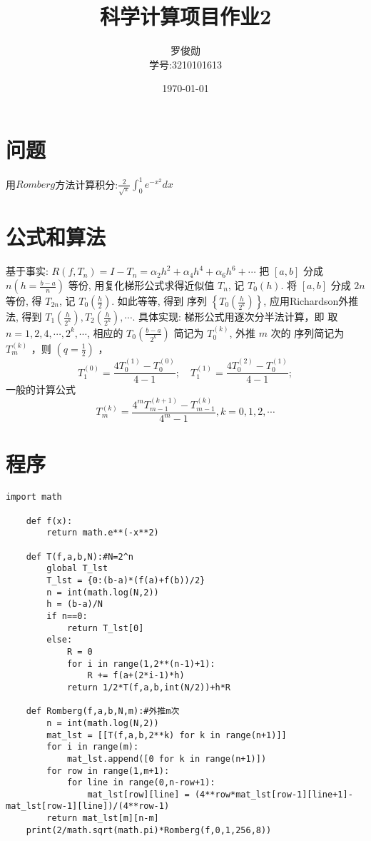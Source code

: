 \documentclass[12pt, a4paper, oneside]{ctexart}
\title{\huge\textbf{科学计算项目作业2}}
\author{罗俊勋\\学号:3210101613}
\date{\today}
\begin{document}
\maketitle
\section*{问题}
用$Romberg$方法计算积分:$\frac{2}{\sqrt{\pi}}\int_0^1e^{-x^2}dx$

\section*{公式和算法}
基于事实: $R\left(f, T_n\right)=I-T_n=\alpha_2 h^2+\alpha_4 h^4+\alpha_6 h^6+\cdots$ 把 $[a, b]$ 分成 $n\left(h=\frac{b-a}{n}\right)$ 等份, 用复化梯形公式求得近似值 $T_n$, 记 $T_0(h)$. 将 $[a, b]$ 分成 $2 n$ 等份, 得 $T_{2 n}$, 记 $T_0\left(\frac{h}{2}\right)$. 如此等等, 得到 序列 $\left\{T_0\left(\frac{h}{2^k}\right)\right\}$, 应用Richardson外推法, 得到 $T_1\left(\frac{h}{2^k}\right), T_2\left(\frac{h}{2^k}\right), \cdots$. 具体实现: 梯形公式用逐次分半法计算，即 取 $n=1,2,4, \cdots, 2^k, \cdots$, 相应的 $T_0\left(\frac{b-a}{2^k}\right)$ 简记为 $T_0^{(k)}$, 外推 $m$ 次的 序列简记为 $T_m^{(k)}$ ，则 $\left(q=\frac{1}{2}\right)$ ，
$$
T_1^{(0)}=\frac{4 T_0^{(1)}-T_0^{(0)}}{4-1} ; \quad T_1^{(1)}=\frac{4 T_0^{(2)}-T_0^{(1)}}{4-1} ;
$$
一般的计算公式
$$
T_m^{(k)}=\frac{4^m T_{m-1}^{(k+1)}-T_{m-1}^{(k)}}{4^m-1}, k=0,1,2, \cdots
$$

\pagebreak
\section*{程序}
\begin{lstlisting}[style = python]
    import math

    def f(x):
        return math.e**(-x**2)

    def T(f,a,b,N):#N=2^n
        global T_lst 
        T_lst = {0:(b-a)*(f(a)+f(b))/2}
        n = int(math.log(N,2))
        h = (b-a)/N
        if n==0:
            return T_lst[0]
        else:
            R = 0
            for i in range(1,2**(n-1)+1):
                R += f(a+(2*i-1)*h)
            return 1/2*T(f,a,b,int(N/2))+h*R
        
    def Romberg(f,a,b,N,m):#外推m次
        n = int(math.log(N,2))
        mat_lst = [[T(f,a,b,2**k) for k in range(n+1)]]
        for i in range(m):
            mat_lst.append([0 for k in range(n+1)])
        for row in range(1,m+1):
            for line in range(0,n-row+1):
                mat_lst[row][line] = (4**row*mat_lst[row-1][line+1]-mat_lst[row-1][line])/(4**row-1)
        return mat_lst[m][n-m]
    print(2/math.sqrt(math.pi)*Romberg(f,0,1,256,8))
\end{lstlisting}
\end{document}
